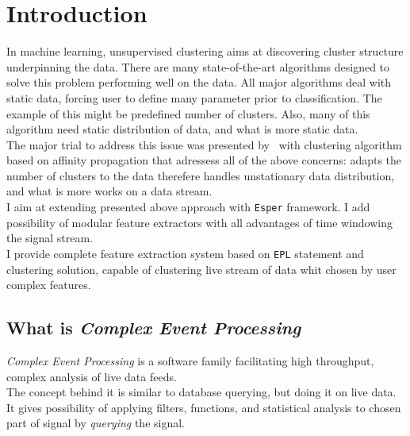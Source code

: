 \documentclass[11pt, letterpaper]{article}            %
\begin{document}
\section{Introduction}
In machine learning, unsupervised clustering aims at discovering cluster structure underpinning the data. There are many state-of-the-art algorithms designed to solve this problem performing well on the data. All major algorithms deal with static data, forcing user to define many parameter prior to classification. The example of this might be predefined number of clusters. Also, many of this algorithm need static distribution of data, and what is more static data.\\
The major trial to address this issue was presented by~\citep{zhang2013data} with clustering algorithm based on affinity propagation that adressess all of the above concerns: adapts the number of clusters to the data therefere handles unstationary data distribution, and what is more works on a data stream.\\
I aim at extending presented above approach with \texttt{Esper} framework. I add possibility of modular feature extractors with all advantages of time windowing the signal stream.\\
I provide complete feature extraction system based on \texttt{EPL} statement and clustering solution, capable of clustering live stream of data whit chosen by user complex features.\\



\subsection{What is \emph{Complex Event Processing}}
\emph{Complex Event Processing} is a software family facilitating high throughput, complex analysis of live data feeds.\\
The concept behind it is similar to database querying, but doing it on live data. It gives possibility of applying filters, functions, and statistical analysis to chosen part of signal by \emph{querying} the signal.
\end{document}
